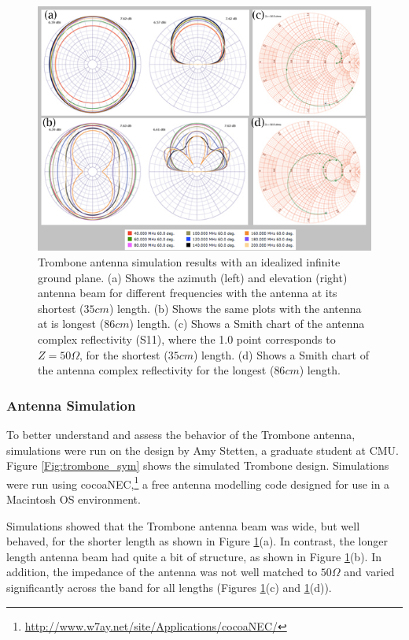 \begin{figure}[htb]
\begin{center}
\includegraphics[width=0.95\linewidth]{SCIHI_system/figures/trombone_no_gp.jpg}
\caption{Trombone antenna simulation results with an idealized infinite ground plane. (a) Shows the azimuth (left) and elevation (right) antenna beam for different frequencies with the antenna at its shortest ($35 cm$) length. (b) Shows the same plots with the antenna at is longest ($86 cm$) length. (c) Shows a Smith chart of the antenna complex reflectivity (S11), where the 1.0 point corresponds to $Z = 50 \Omega$, for the shortest ($35 cm$) length. (d) Shows a Smith chart of the antenna complex reflectivity for the longest ($86 cm$) length. }
\label{Fig:trsym_nogp}
\end{center}
\end{figure}

\subsubsection{Antenna Simulation}

To better understand and assess the behavior of the Trombone antenna, simulations were run on the design by Amy Stetten, a graduate student at CMU. Figure \ref{Fig:trombone_sym} shows the simulated Trombone design. Simulations were run using cocoaNEC,\footnote{\url{http://www.w7ay.net/site/Applications/cocoaNEC/}} a free antenna modelling code designed for use in a Macintosh OS environment. 

Simulations showed that the Trombone antenna beam was wide, but well behaved, for the shorter length as shown in Figure \ref{Fig:trsym_nogp}(a). In contrast, the longer length antenna beam had quite a bit of structure, as shown in Figure \ref{Fig:trsym_nogp}(b). In addition, the impedance of the antenna was not well matched to $50 \Omega$ and varied significantly across the band for all lengths (Figures \ref{Fig:trsym_nogp}(c) and \ref{Fig:trsym_nogp}(d)). 

